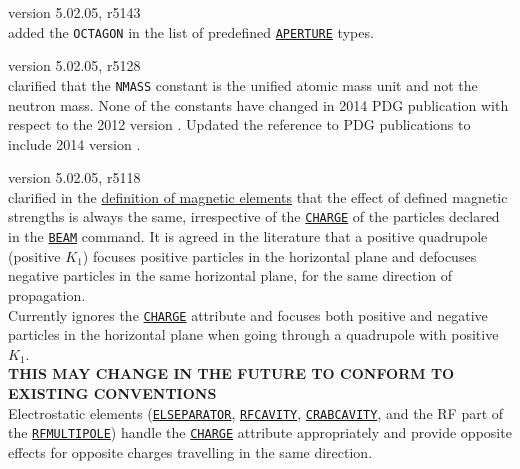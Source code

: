 \begin{madlist}

   version 5.02.05, r5143\\
  added the \texttt{OCTAGON} in the list of predefined 
  \hyperref[chap:aperture]{\texttt{APERTURE}} types.
  
   version 5.02.05, r5128\\
  clarified that the \texttt{NMASS} constant is the unified atomic mass 
  unit and not the neutron mass. None of the constants have changed in 2014 PDG 
  publication with respect to the 2012 version \cite{PDG2012}. Updated
  the reference to PDG publications to include 2014 version \cite{PDG2014}.

   version 5.02.05, r5118\\
  clarified in the \hyperref[chap:elements]{definition of magnetic elements} 
  that the effect of defined magnetic strengths is always the same, 
  irrespective of the \hyperref[sec:beam]{\texttt{CHARGE}} of the particles declared 
  in the \hyperref[sec:beam]{\texttt{BEAM}} command. It is agreed in the literature 
  that a positive quadrupole (positive $K_1$) focuses positive particles in the 
  horizontal plane and defocuses negative particles in the same horizontal 
  plane, for the same direction of propagation. \\ 
  Currently \mad ignores the \hyperref[sec:beam]{\texttt{CHARGE}} attribute and 
  focuses both positive and negative particles in the horizontal plane when 
  going through a quadrupole with positive $K_1$. \\
  \textbf{THIS MAY CHANGE IN THE FUTURE TO CONFORM TO EXISTING CONVENTIONS}\\
  Electrostatic elements (\hyperref[sec:elseparator]{\texttt{ELSEPARATOR}}, 
  \hyperref[sec:rfcavity]{\texttt{RFCAVITY}},
  \hyperref[sec:crabcavity]{\texttt{CRABCAVITY}}, and the RF part of the
  \hyperref[sec:rfmultipole]{\texttt{RFMULTIPOLE}}) handle the
  \hyperref[sec:beam]{\texttt{CHARGE}} attribute appropriately and provide 
  opposite effects for opposite charges travelling in the same direction. 



\end{madlist}
